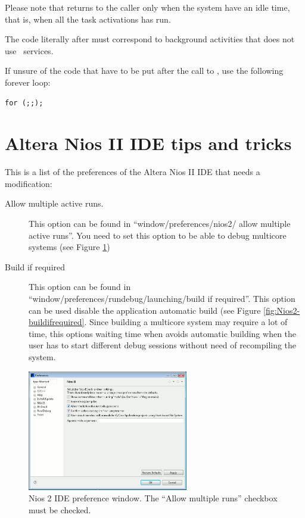 Please note that  returns to the caller only when the
system have an idle time, that is, when all the task activations has
run.

The code literally after  must correspond to background
activities that does not use \ee\ services.

If unsure of the code that have to be put after the call to
, use the following forever loop:

\begin{lstlisting}
for (;;);
\end{lstlisting}





\section{Altera Nios II IDE tips and tricks}

This is a list of the preferences of the Altera Nios II IDE that needs
a modification:

\begin{description}
\item[Allow multiple active runs.]  This option can be found in
  ``window/preferences/nios2/ allow multiple active runs''. You need to
  set this option to be able to debug multicore systems (see
  Figure \ref{fig:Nios2-preference})

\item[Build if required] This option can be found in
  ``window/preferences/rundebug/launching/build if required''. This
  option can be used disable the application automatic build (see
  Figure \ref{fig:Nios2-buildifrequired}. Since building a
  multicore system may require a lot of time, this options
  waiting time when avoids automatic building when the user has to
  start different debug sessions without need of recompiling the
  system.
\end{description}

\begin{figure}
  \begin{center}
    \includegraphics[width=7cm, bb=0 0 717 540]{images/Nios2_preferences.png}
  \end{center}
  \caption{Nios 2 IDE preference window. The ``Allow multiple runs'' checkbox must be checked.}
  \label{fig:Nios2-preference} 
\end{figure}

